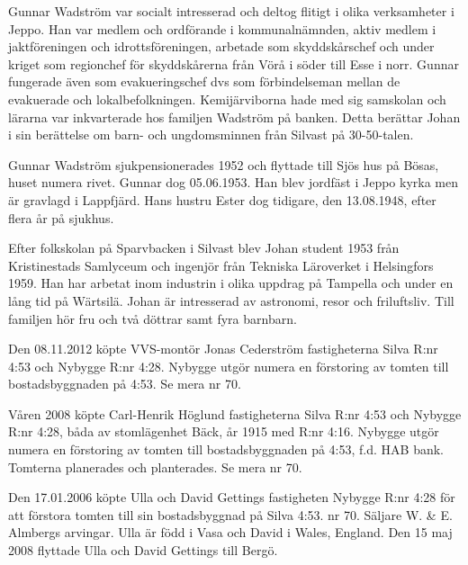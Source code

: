 Gunnar Wadström var socialt intresserad och deltog flitigt i olika verksamheter i Jeppo. Han var medlem och	ordförande 	i kommunalnämnden, aktiv medlem i jaktföreningen och idrottsföreningen, arbetade som skyddskårschef och under kriget som regionchef för skyddskårerna från Vörå i söder till Esse i norr. Gunnar fungerade även som evakueringschef dvs som förbindelseman mellan de evakuerade och lokalbefolkningen. Kemijärviborna hade med sig samskolan och lärarna var inkvarterade hos familjen Wadström på banken. Detta berättar Johan i sin berättelse om barn- och ungdomsminnen från Silvast på 30-50-talen.

Gunnar Wadström sjukpensionerades 1952 och flyttade till Sjös hus på Bösas, huset numera rivet. Gunnar dog 05.06.1953. Han blev jordfäst i Jeppo kyrka men är gravlagd i Lappfjärd. Hans hustru Ester dog tidigare, den 13.08.1948, efter flera år på sjukhus.

Efter folkskolan på Sparvbacken i Silvast blev Johan student 1953 från Kristinestads Samlyceum och ingenjör från Tekniska Läroverket i Helsingfors 1959. Han har arbetat inom industrin i olika uppdrag på Tampella och under en lång tid på Wärtsilä. Johan är intresserad av astronomi,	resor och friluftsliv. Till familjen hör fru och två döttrar samt fyra barnbarn.





Den 08.11.2012 köpte VVS-montör Jonas Cederström fastigheterna Silva R:nr 4:53 och Nybygge R:nr 4:28. Nybygge utgör numera en förstoring av tomten till bostadsbyggnaden på 4:53. Se mera nr 70.


Våren 2008 köpte Carl-Henrik Höglund fastigheterna Silva R:nr 4:53 och Nybygge R:nr 4:28, båda av stomlägenhet Bäck, år 1915 med R:nr 4:16. Nybygge utgör numera en förstoring av tomten till bostadsbyggnaden på 4:53, f.d. HAB bank. Tomterna planerades och planterades. Se mera nr 70.


Den 17.01.2006 köpte Ulla och David Gettings fastigheten Nybygge R:nr 4:28 för att förstora tomten till sin			bostadsbyggnad på Silva 4:53. nr 70. Säljare W. \& E. Almbergs arvingar. Ulla är född i Vasa och David i Wales, 		England. Den 15 maj 2008 flyttade Ulla och David Gettings till Bergö.


\jhvspace{}



